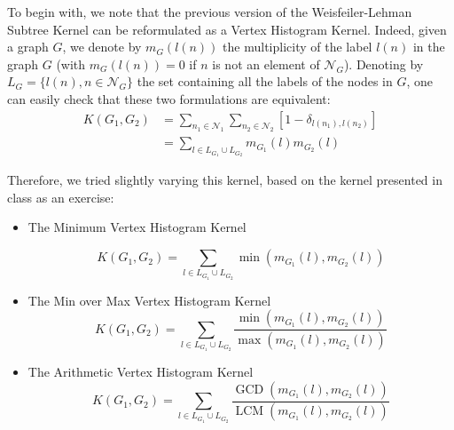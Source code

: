 \documentclass{IEEEtran}
\begin{document}
To begin with, we note that the previous version of the Weisfeiler-Lehman Subtree Kernel can be reformulated
as a Vertex Histogram Kernel. Indeed,
given a graph $G$, we denote by $m_G(l(n))$ the multiplicity of
the label $l(n)$ in the graph $G$ (with $m_G(l(n)) = 0$ if $n$ is not an
element of $\mathcal N_G$). Denoting by $L_G = \{l(n), n \in \mathcal N_G\}$
the set containing all the labels of the nodes in $G$,
one can easily check that these two formulations are equivalent:
\begin{equation*}
    \begin{split}
        K(G_1, G_2) & = \sum_{n_1 \in \mathcal{N}_1} \sum_{n_2 \in \mathcal{N}_2} [1 - \delta_{l(n_1), l(n_2)}]\\
        &= \sum_{l \in L_{G_1} \cup L_{G_2}} m_{G_1}(l)m_{G_2}(l)
    \end{split}
\end{equation*}

Therefore, we tried slightly varying this kernel, based on the kernel presented in class as an exercise:

\begin{itemize}
    \item The Minimum Vertex Histogram Kernel

          \begin{equation*}
              K(G_1, G_2) = \sum_{l \in L_{G_1} \cup L_{G_2}} \operatorname*{min}(m_{G_1}(l), m_{G_2}(l))
          \end{equation*}

    \item The Min over Max Vertex Histogram Kernel
          \begin{equation*}
              K(G_1, G_2) = \sum_{l \in L_{G_1} \cup L_{G_2}} \frac{\operatorname*{min}(m_{G_1}(l), m_{G_2}(l))}{\operatorname*{max}(m_{G_1}(l), m_{G_2}(l))}
          \end{equation*}
    \item The Arithmetic Vertex Histogram Kernel
          \begin{equation*}
              K(G_1, G_2) = \sum_{l \in L_{G_1} \cup L_{G_2}} \frac{\operatorname*{GCD}(m_{G_1}(l), m_{G_2}(l))}{\operatorname*{LCM}(m_{G_1}(l), m_{G_2}(l))}
          \end{equation*}
\end{itemize}
\end{document}
